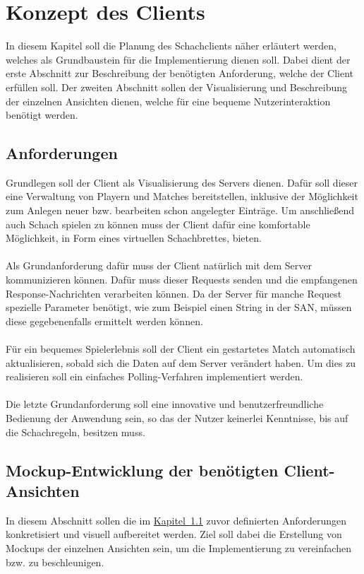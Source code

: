 
\chapter{Konzept des Clients}
In diesem Kapitel soll die Planung des Schachclients näher erläutert werden, welches als Grundbaustein für die Implementierung dienen soll. Dabei dient der erste Abschnitt zur Beschreibung der benötigten Anforderung, welche der Client erfüllen soll. Der zweiten Abschnitt sollen der Visualisierung und Beschreibung der einzelnen Ansichten dienen, welche für eine bequeme Nutzerinteraktion benötigt werden.

\section{Anforderungen}\label{sec:anforderungenClient}
Grundlegen soll der Client als Visualisierung des Servers dienen. Dafür soll dieser eine Verwaltung von Playern und Matches bereitstellen, inklusive der Möglichkeit zum Anlegen neuer bzw. bearbeiten schon angelegter Einträge. Um anschließend auch Schach spielen zu können muss der Client dafür eine komfortable Möglichkeit, in Form eines virtuellen Schachbrettes, bieten.\\
\\
Als Grundanforderung dafür muss der Client natürlich mit dem Server kommunizieren können. Dafür muss dieser Requests senden und die empfangenen Response-Nachrichten verarbeiten können. Da der Server für manche Request spezielle Parameter benötigt, wie zum Beispiel einen String in der \gls{SAN}, müssen diese gegebenenfalls ermittelt werden können.\\
\\
Für ein bequemes Spielerlebnis soll der Client ein gestartetes Match automatisch aktualisieren, sobald sich die Daten auf dem Server verändert haben. Um dies zu realisieren soll ein einfaches Polling-Verfahren implementiert werden.\\
\\ 
Die letzte Grundanforderung soll eine innovative und benutzerfreundliche Bedienung der Anwendung sein, so das der Nutzer keinerlei Kenntnisse, bis auf die Schachregeln, besitzen muss.

\section{Mockup-Entwicklung der benötigten Client-Ansichten}\label{sec:views}
In diesem Abschnitt sollen die im \hyperref[sec:anforderungenClient]{Kapitel~\ref{sec:anforderungenClient}} zuvor definierten Anforderungen konkretisiert und visuell aufbereitet werden. Ziel soll dabei die Erstellung von Mockups der einzelnen Ansichten sein, um die Implementierung zu vereinfachen bzw. zu beschleunigen.

